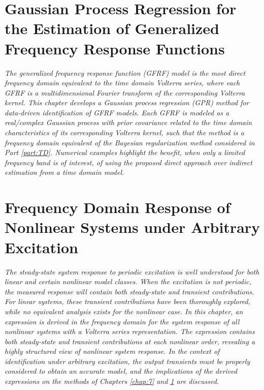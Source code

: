 \documentclass[11pt,twoside]{report}
\begin{document}
\cleardoublepage
\chapter{Gaussian Process Regression for the Estimation of Generalized Frequency Response Functions}
\label{chap:8}
\emph{The generalized frequency response function (GFRF) model is the most direct frequency domain equivalent to the time domain Volterra series, where each GFRF is a multidimensional Fourier transform of the corresponding Volterra kernel. This chapter develops a Gaussian process regression (GPR) method for data-driven identification of GFRF models. Each GFRF is modeled as a real/complex Gaussian process with prior covariance related to the time domain characteristics of its corresponding Volterra kernel, such that the method is a frequency domain equivalent of the Bayesian regularization method considered in Part \ref{part:TD}. Numerical examples highlight the benefit, when only a limited frequency band is of interest, of using the proposed direct approach over indirect estimation from a time domain model.}
\newpage


\cleardoublepage
\chapter{Frequency Domain Response of Nonlinear Systems under Arbitrary Excitation}
\label{chap:9}
\emph{The steady-state system response to periodic excitation is well understood for both linear and certain nonlinear model classes. When the excitation is not periodic, the measured response will contain both steady-state and transient contributions. For linear systems, these transient contributions have been thoroughly explored, while no equivalent analysis exists for the nonlinear case. In this chapter, an expression is derived in the frequency domain for the system response of all nonlinear systems with a Volterra series representation. The expression contains both steady-state and transient contributions at each nonlinear order, revealing a highly structured view of nonlinear system response. In the context of identification under arbitrary excitation, the output transients must be properly considered to obtain an accurate model, and the implications of the derived expressions on the methods of Chapters \ref{chap:7} and \ref{chap:8} are discussed.}
\newpage


\cleardoublepage
\end{document}

